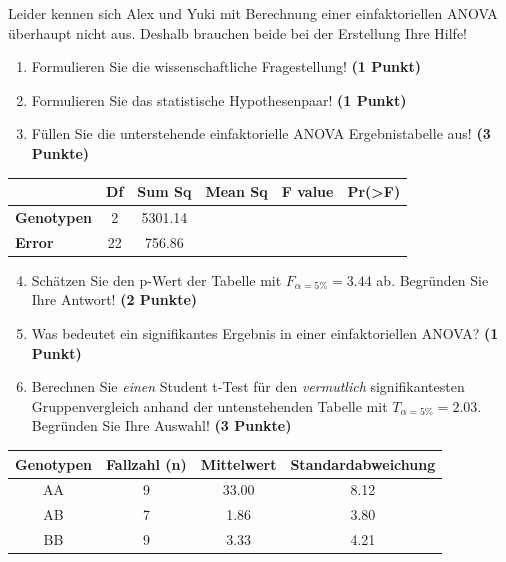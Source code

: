 \documentclass[a4paper, 9pt]{scrartcl}\usepackage[]{graphicx}\usepackage[]{xcolor}
\newenvironment{knitrout}{}{} %
\begin{document}
\vspace{1ex}

Leider kennen sich Alex und Yuki mit Berechnung einer einfaktoriellen ANOVA überhaupt nicht aus. Deshalb brauchen beide bei der Erstellung Ihre Hilfe! 

\begin{enumerate}
  \item Formulieren Sie die wissenschaftliche Fragestellung! \textbf{(1 Punkt)}
  \item Formulieren Sie das statistische Hypothesenpaar! \textbf{(1 Punkt)}
\item Füllen Sie die unterstehende einfaktorielle ANOVA Ergebnistabelle aus! \textbf{(3 Punkte)}
\end{enumerate}

\vspace{1Ex}

\begin{center}
  \Large
  \begin{tabular}{lccccp{3cm}}
\toprule
     & \textbf{Df} & \textbf{Sum Sq} & \textbf{Mean Sq} & \textbf{F value} & \textbf{Pr(>F)} \strut\\
    \midrule
   \textbf{Genotypen}  & 2 & 5301.14 &  &  &  \strut\\
   \textbf{Error}  & 22 & 756.86 &  &  &  \strut\\
\bottomrule
  \end{tabular}
\end{center}

\vspace{1Ex}

\begin{enumerate}
  \setcounter{enumi}{3}
\item Schätzen Sie den p-Wert der Tabelle mit $F_{\alpha = 5\%} = 3.44$ ab. Begründen Sie Ihre Antwort! \textbf{(2 Punkte)}
\item Was bedeutet ein signifikantes Ergebnis in einer einfaktoriellen ANOVA? \textbf{(1 Punkt)}
\item Berechnen Sie \textit{einen} Student t-Test für den \textit{vermutlich} signifikantesten Gruppenvergleich anhand der untenstehenden Tabelle mit $T_{\alpha = 5\%} = 2.03$. Begründen Sie Ihre Auswahl! \textbf{(3 Punkte)}
\end{enumerate}


\begin{knitrout}
\color{fgcolor}\begin{table}[!h]
\centering\begingroup\fontsize{11}{13}\selectfont

\begin{tabular}{cccc}
\toprule
\textbf{Genotypen} & \textbf{Fallzahl (n)} & \textbf{Mittelwert} & \textbf{Standardabweichung}\\
\midrule
AA & 9 & 33.00 & 8.12\\
AB & 7 & 1.86 & 3.80\\
BB & 9 & 3.33 & 4.21\\
\bottomrule
\end{tabular}
\endgroup{}
\end{table}

\end{knitrout}
\end{document}
